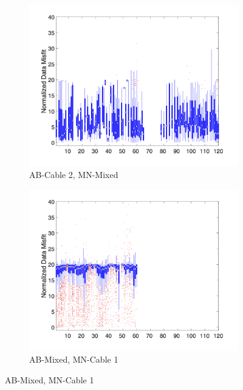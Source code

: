 \documentclass[final,authoryear,5p,times,twocolumn]{elsarticle}
\begin{document}
\begin{figure}[!ht]
   \vspace{1em}

   \begin{subfigure}[b]{0.475\linewidth}
       \centering
       \includegraphics[trim=1.6cm 1.7cm 2cm 1.3cm, clip=true, width=\linewidth]{./Figures/Fig8g.png}
       \caption{AB-Cable 2, MN-Mixed}
       \label{fig:Boxplot_AB_Cable2_MN_Mixed_Misfit_vs_M_ElecID}
   \end{subfigure}
   \hfill
   \begin{subfigure}[b]{0.475\linewidth}
       \centering
       \includegraphics[trim=1.6cm 1.7cm 2cm 1.3cm, clip=true, width=\linewidth]{./Figures/Fig8h.png}
       \caption{AB-Mixed, MN-Cable 1}
       \label{fig:Boxplot_AB_Mixed_MN_Cable1_Misfit_vs_M_ElecID}
   \end{subfigure}


\end{figure}
\end{document}
